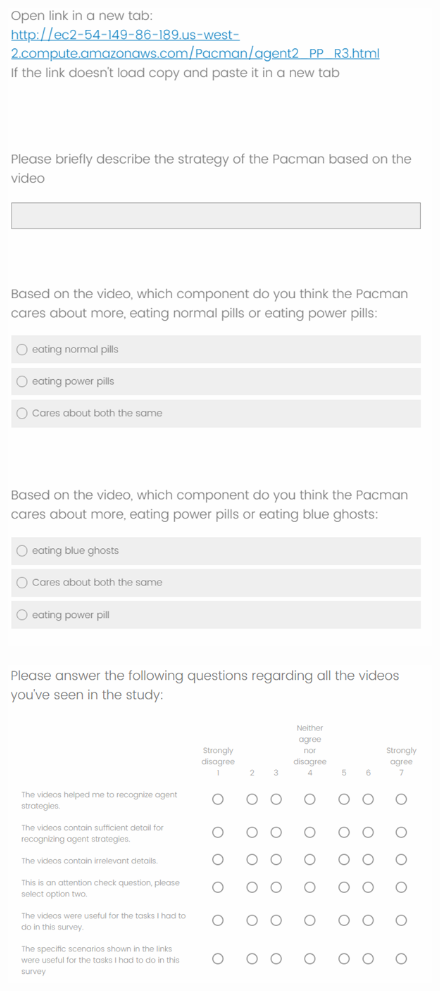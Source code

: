 \begin{figure}[t]
\centering
\includegraphics[width=0.7\linewidth]{agent_q_1.png}
\end{figure}
\begin{figure}[t]
\centering
\includegraphics[width=0.7\linewidth]{sat_q.png}
\end{figure}

\clearpage

